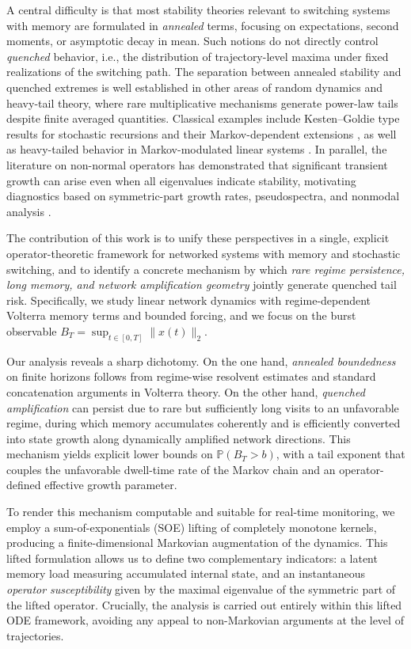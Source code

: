 \documentclass[12pt,a4paper]{article}
\theoremstyle{definition}
\theoremstyle{remark}
\begin{document}
A central difficulty is that most stability theories relevant to switching systems with memory are formulated in \emph{annealed} terms, focusing on expectations, second moments, or asymptotic decay in mean. Such notions do not directly control \emph{quenched} behavior, i.e., the distribution of trajectory-level maxima under fixed realizations of the switching path. The separation between annealed stability and quenched extremes is well established in other areas of random dynamics and heavy-tail theory, where rare multiplicative mechanisms generate power-law tails despite finite averaged quantities. Classical examples include Kesten–Goldie type results for stochastic recursions and their Markov-dependent extensions \cite{kesten1973,goldie1991,buraczewski2016}, as well as heavy-tailed behavior in Markov-modulated linear systems \cite{desaporta2005}. In parallel, the literature on non-normal operators has demonstrated that significant transient growth can arise even when all eigenvalues indicate stability, motivating diagnostics based on symmetric-part growth rates, pseudospectra, and nonmodal analysis \cite{trefethen1993,embree2005,schmid2007}. 

The contribution of this work is to unify these perspectives in a single, explicit operator-theoretic framework for networked systems with memory and stochastic switching, and to identify a concrete mechanism by which \emph{rare regime persistence, long memory, and network amplification geometry} jointly generate quenched tail risk. Specifically, we study linear network dynamics with regime-dependent Volterra memory terms and bounded forcing, and we focus on the burst observable $ B_T = \sup_{t\in[0,T]} \|x(t)\|_2$.

Our analysis reveals a sharp dichotomy. On the one hand, \emph{annealed boundedness} on finite horizons follows from regime-wise resolvent estimates and standard concatenation arguments in Volterra theory. On the other hand, \emph{quenched amplification} can persist due to rare but sufficiently long visits to an unfavorable regime, during which memory accumulates coherently and is efficiently converted into state growth along dynamically amplified network directions. This mechanism yields explicit lower bounds on $\mathbb{P}(B_T>b)$, with a tail exponent that couples the unfavorable dwell-time rate of the Markov chain and an operator-defined effective growth parameter.

To render this mechanism computable and suitable for real-time monitoring, we employ a sum-of-exponentials (SOE) lifting of completely monotone kernels, producing a finite-dimensional Markovian augmentation of the dynamics. This lifted formulation allows us to define two complementary indicators: a latent memory load measuring accumulated internal state, and an instantaneous \emph{operator susceptibility} given by the maximal eigenvalue of the symmetric part of the lifted operator. Crucially, the analysis is carried out entirely within this lifted ODE framework, avoiding any appeal to non-Markovian arguments at the level of trajectories.
\end{document}
